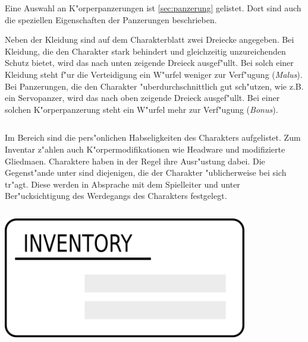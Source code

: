 Eine Auswahl an K"orperpanzerungen ist \cref{sec:panzerung} gelistet. Dort sind auch die speziellen Eigenschaften der Panzerungen beschrieben.

Neben der Kleidung sind auf dem Charakterblatt zwei Dreiecke angegeben. Bei Kleidung, die den Charakter stark behindert und gleichzeitig unzureichenden Schutz bietet, wird das nach unten zeigende Dreieck ausgef"ullt. Bei solch einer Kleidung steht f"ur die Verteidigung ein W"urfel weniger zur Verf"ugung (\emph{Malus}). Bei Panzerungen, die den Charakter "uberdurchschnittlich gut sch"utzen, wie z.B. ein Servopanzer, wird das nach oben zeigende Dreieck ausgef"ullt. Bei einer solchen K"orperpanzerung steht ein W"urfel mehr zur Verf"ugung (\emph{Bonus}).

\begin{column}[l]{0.55}
    Im Bereich  sind die pers"onlichen Habseligkeiten des Charakters aufgelistet. Zum Inventar z"ahlen auch K"orpermodifikationen wie Headware und modifizierte Gliedma\3en. Charaktere haben in der Regel ihre Ausr"ustung dabei. Die Gegenst"ande unter  sind diejenigen, die der Charakter "ublicherweise bei sich tr"agt. Diese werden in Absprache mit dem Spielleiter und unter Ber"ucksichtigung des Werdegangs des Charakters festgelegt.
\end{column}
\begin{column}[r]{0.45}
    \centering
    \includegraphics[width=0.80\textwidth]{images/character_inventory.png}
\end{column}
